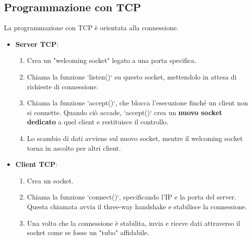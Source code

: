 \subsection{Programmazione con TCP}
La programmazione con TCP è orientata alla connessione.
\begin{itemize}
    \item \textbf{Server TCP}:
    \begin{enumerate}
        \item Crea un "welcoming socket" legato a una porta specifica.
        \item Chiama la funzione `listen()` su questo socket, mettendolo in attesa di richieste di connessione.
        \item Chiama la funzione `accept()`, che blocca l'esecuzione finché un client non si connette. Quando ciò accade, `accept()` crea un \textbf{nuovo socket dedicato} a quel client e restituisce il controllo.
        \item Lo scambio di dati avviene sul nuovo socket, mentre il welcoming socket torna in ascolto per altri client.
    \end{enumerate}
    \item \textbf{Client TCP}:
    \begin{enumerate}
        \item Crea un socket.
        \item Chiama la funzione `connect()`, specificando l'IP e la porta del server. Questa chiamata avvia il three-way handshake e stabilisce la connessione.
        \item Una volta che la connessione è stabilita, invia e riceve dati attraverso il socket come se fosse un "tubo" affidabile.
    \end{enumerate}
\end{itemize}